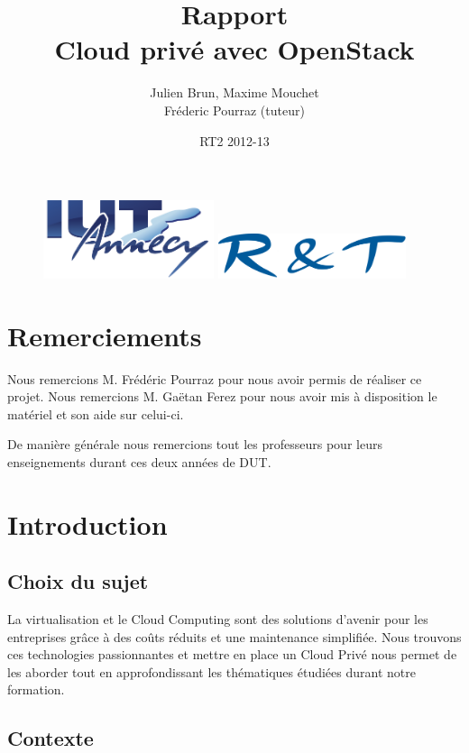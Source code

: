 \documentclass{report}
\title{Rapport \\ \og Cloud privé avec OpenStack \fg}
\author{Julien Brun, Maxime Mouchet \\ Fréderic Pourraz (tuteur)}
\date{RT2 2012-13}
\begin{document}
\begin{figure}
\includegraphics[width=5cm]{images/iut.png}\hfill
\includegraphics[width=5.5cm]{images/rt.png}
\end{figure}

\maketitle

\clearpage
\thispagestyle{empty}
\null\newpage

\chapter*{Remerciements}
\thispagestyle{empty}
Nous remercions M. Frédéric Pourraz pour nous avoir permis de réaliser ce projet.\newline
Nous remercions M. Gaëtan Ferez pour nous avoir mis à disposition le matériel et son aide sur celui-ci.

De manière générale nous remercions tout les professeurs pour leurs enseignements durant ces deux années de DUT.

\renewcommand{\contentsname}{Sommaire (swap Logiciel et OS)}
\tableofcontents

\chapter{Introduction}
\section{Choix du sujet}
La virtualisation et le Cloud Computing sont des solutions d'avenir pour les entreprises grâce à des coûts réduits et une maintenance simplifiée. Nous trouvons ces technologies passionnantes et mettre en place un Cloud Privé nous permet de les aborder tout en approfondissant les thématiques étudiées durant notre formation.

\section{Contexte}
\end{document}
